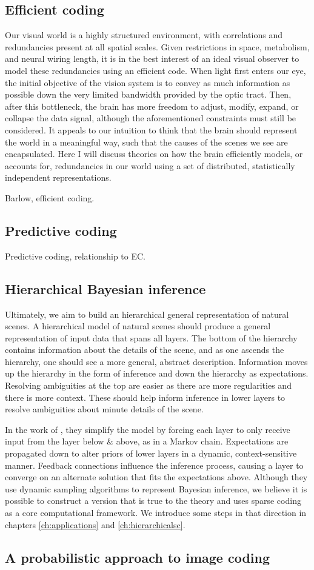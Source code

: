 \subsection{Efficient coding}
Our visual world is a highly structured environment, with correlations and redundancies present at all spatial scales. Given restrictions in space, metabolism, and neural wiring length, it is in the best interest of an ideal visual observer to model these redundancies using an efficient code. When light first enters our eye, the initial objective of the vision system is to convey as much information as possible down the very limited bandwidth provided by the optic tract. Then, after this bottleneck, the brain has more freedom to adjust, modify, expand, or collapse the data signal, although the aforementioned constraints must still be considered. It appeals to our intuition to think that the brain should represent the world in a meaningful way, such that the causes of the scenes we see are encapsulated. Here I will discuss theories on how the brain efficiently models, or accounts for, redundancies in our world using a set of distributed, statistically independent representations.

Barlow, efficient coding.


\subsection{Predictive coding}
Predictive coding, relationship to EC.


\subsection{Hierarchical Bayesian inference}
Ultimately, we aim to build an hierarchical general representation of natural scenes. A hierarchical model of natural scenes should produce a general representation of input data that spans all layers. The bottom of the hierarchy contains information about the details of the scene, and as one ascends the hierarchy, one should see a more general, abstract description. Information moves up the hierarchy in the form of inference and down the hierarchy as expectations. Resolving ambiguities at the top are easier as there are more regularities and there is more context. These should help inform inference in lower layers to resolve ambiguities about minute details of the scene.

In the work of \citet{lee2003hierarchical}, they simplify the model by forcing each layer to only receive input from the layer below & above, as in a Markov chain. Expectations are propagated down to alter priors of lower layers in a dynamic, context-sensitive manner. Feedback connections influence the inference process, causing a layer to converge on an alternate solution that fits the expectations above. Although they use dynamic sampling algorithms to represent Bayesian inference, we believe it is possible to construct a version that is true to the theory and uses sparse coding as a core computational framework. We introduce some steps in that direction in chapters \ref{ch:applications} and \ref{ch:hierarchicalsc}.


\subsection{A probabilistic approach to image coding}
